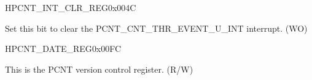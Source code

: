 \begin{register}{H}{PCNT\_INT\_CLR\_REG}{0x{}004C}\label{regdesc:PCNTINTCLRREG}
%
%
%
%
%
\regnewline%
\begin{regdesc}\begin{reglist}
\label{fielddesc:PCNTCNTTHREVENTUNINTCLR}\item [PCNT\_CNT\_THR\_EVENT\_U\regindex{n}\_INT\_CLR] Set this bit to clear the PCNT\_CNT\_THR\_EVENT\_U\_INT interrupt. (WO)
\end{reglist}\end{regdesc}
\end{register}


\begin{register}{H}{PCNT\_DATE\_REG}{0x{}00FC}\label{regdesc:PCNTDATEREG}
%
\regnewline%
\begin{regdesc}\begin{reglist}
\label{fielddesc:PCNTDATE}\item [PCNT\_DATE] This is the PCNT version control register. (R/W)
\end{reglist}\end{regdesc}
\end{register}


